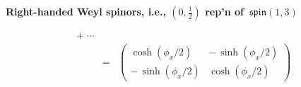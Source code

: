 \begin{frame}{\headingColor\bf\Large Right-handed Weyl spinors, i.e., $\left(0,\frac{1}{2}\right)$ rep'n of \,$\mathfrak{spin}(1,3)$}
\begin{itemize}
\begin{eqnarray*}
		+ \;\cdots
	\\
	& = &
		\left(\!\!\begin{array}{rr} \cosh(\phi_{x}/2) & -\,\sinh(\phi_{x}/2) \\ -\,\sinh(\phi_{x}/2) & \cosh(\phi_{x}/2) \end{array}\!\!\!\right)
	\end{eqnarray*}
\end{itemize}

\end{frame}
\normalsize

